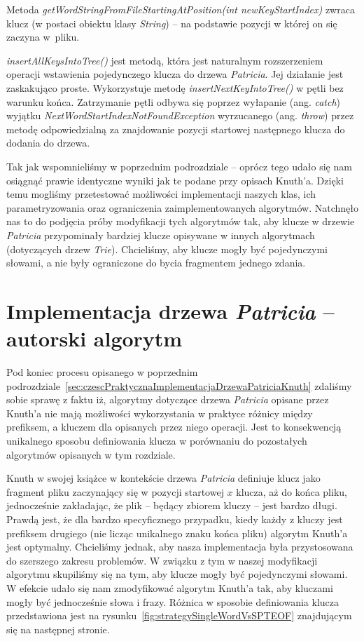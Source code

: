 		Metoda \emph{getWordStringFromFileStartingAtPosition(int newKeyStartIndex)} zwraca klucz (w postaci obiektu klasy \emph{String}) -- na podstawie pozycji w której on się zaczyna w~pliku.
		
		\emph{insertAllKeysIntoTree()} jest metodą, która jest naturalnym rozszerzeniem operacji wstawienia pojedynczego klucza do drzewa \emph{Patricia}. Jej działanie jest zaskakująco proste. Wykorzystuje metodę \emph{insertNextKeyIntoTree()} w pętli bez warunku końca. Zatrzymanie pętli odbywa się poprzez wyłapanie (ang. \emph{catch}) wyjątku \emph{NextWordStartIndexNotFoundException} wyrzucanego (ang. \emph{throw}) przez metodę odpowiedzialną za znajdowanie pozycji startowej następnego klucza do dodania do drzewa.\newpage
		
        Tak jak wspomnieliśmy w poprzednim podrozdziale -- oprócz tego udało się nam osiągnąć prawie identyczne wyniki jak te podane przy opisach Knuth'a. Dzięki temu mogliśmy przetestować możliwości implementacji naszych klas, ich parametryzowania oraz ograniczenia zaimplementowanych algorytmów. Natchnęło nas to do podjęcia próby modyfikacji tych algorytmów tak, aby klucze w drzewie \emph{Patricia} przypominały bardziej klucze opisywane w innych algorytmach (dotyczących drzew \emph{Trie}). Chcieliśmy, aby klucze mogły być pojedynczymi słowami, a nie były ograniczone do bycia fragmentem jednego zdania.
		
		\section{Implementacja drzewa \emph{Patricia} -- autorski algorytm}\label{sec:czescPraktycznaImplementacjaDrzewaPatriciaAutorska}
		
		Pod koniec procesu opisanego w poprzednim podrozdziale~\ref{sec:czescPraktycznaImplementacjaDrzewaPatriciaKnuth} zdaliśmy sobie sprawę z faktu iż, algorytmy dotyczące drzewa \emph{Patricia} opisane przez Knuth'a nie mają możliwości wykorzystania w praktyce różnicy między prefiksem, a kluczem dla opisanych przez niego operacji. Jest to konsekwencją unikalnego sposobu definiowania klucza w porównaniu do pozostałych algorytmów opisanych w tym rozdziale. 
		
		Knuth w swojej książce w kontekście drzewa \emph{Patricia} definiuje klucz jako fragment pliku zaczynający się w pozycji startowej $x$ klucza, aż do końca pliku, jednocześnie zakładając, że plik -- będący zbiorem kluczy -- jest bardzo długi. Prawdą jest, że dla bardzo specyficznego przypadku, kiedy każdy z kluczy jest prefiksem drugiego (nie licząc unikalnego znaku końca pliku) algorytm Knuth'a jest optymalny. Chcieliśmy jednak, aby nasza implementacja była przystosowana do szerszego zakresu problemów. W związku z tym w naszej modyfikacji algorytmu skupiliśmy się na tym, aby klucze mogły być pojedynczymi słowami. W efekcie udało się nam zmodyfikować algorytm Knuth'a tak, aby kluczami mogły być jednocześnie słowa i frazy. Różnica w sposobie definiowania klucza przedstawiona jest na rysunku~\ref{fig:strategySingleWordVsSPTEOF} znajdującym się na następnej stronie.
		
